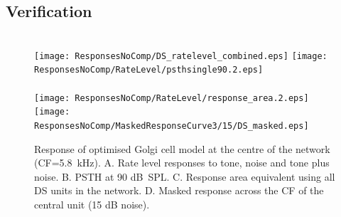 

\clearpage
\subsection{Verification}    \label{sec:DS:verification}


\begin{figure}[htb]
\hspace{0.5\textwidth}\hfill\\
\texttt{[image: ResponsesNoComp/DS\_ratelevel\_combined.eps]}%
\texttt{[image: ResponsesNoComp/RateLevel/psthsingle90.2.eps]}\\
\hspace{0.5\textwidth}\hfill\\
\texttt{[image: ResponsesNoComp/RateLevel/response\_area.2.eps]}%
\texttt{[image: ResponsesNoComp/MaskedResponseCurve3/15/DS\_masked.eps]}\\
\caption[Optimised DS cell model responses]{Response of optimised Golgi cell model at the centre of the network (CF=5.8~kHz). 
A. Rate level responses to tone, noise and tone plus noise. 
B. PSTH at 90 dB~SPL.  
C. Response area equivalent using all DS units in the network. 
D. Masked response across the CF of the central unit (15 dB noise).} \label{fig:DS_verification}
\end{figure}


